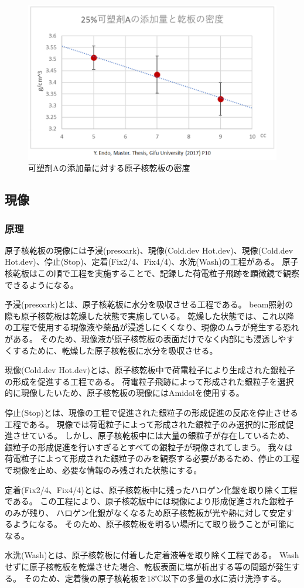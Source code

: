 \documentclass[12pt,a4paper]{jarticle}
\begin{document}
\begin{figure}[htbp]
  \centering
     \includegraphics[width=140mm]{kasozai.png}
  \caption{可塑剤Aの添加量に対する原子核乾板の密度\label{fig:kasozai}}
\end{figure}
\newpage
\subsection{現像}
\subsubsection{原理}
原子核乾板の現像には予浸(presoark)、現像(Cold.dev Hot.dev)、現像(Cold.dev Hot.dev)、停止(Stop)、定着(Fix2/4、Fix4/4)、水洗(Wash)の工程がある。
原子核乾板はこの順で工程を実施することで、記録した荷電粒子飛跡を顕微鏡で観察できるようになる。
\par
予浸(presoark)とは、原子核乾板に水分を吸収させる工程である。
beam照射の際も原子核乾板は乾燥した状態で実施している。
乾燥した状態では、これ以降の工程で使用する現像液や薬品が浸透しにくくなり、現像のムラが発生する恐れがある。
そのため、現像液が原子核乾板の表面だけでなく内部にも浸透しやすくするために、乾燥した原子核乾板に水分を吸収させる。
\par
現像(Cold.dev Hot.dev)とは、原子核乾板中で荷電粒子により生成された銀粒子の形成を促進する工程である。
荷電粒子飛跡によって形成された銀粒子を選択的に現像したいため、原子核乾板の現像にはAmidolを使用する。
\par
停止(Stop)とは、現像の工程で促進された銀粒子の形成促進の反応を停止させる工程である。
現像では荷電粒子によって形成された銀粒子のみ選択的に形成促進させている。
しかし、原子核乾板中には大量の銀粒子が存在しているため、銀粒子の形成促進を行いすぎるとすべての銀粒子が現像されてしまう。
我々は荷電粒子によって形成された銀粒子のみを観察する必要があるため、停止の工程で現像を止め、必要な情報のみ残された状態にする。
\par
定着(Fix2/4、Fix4/4)とは、原子核乾板中に残ったハロゲン化銀を取り除く工程である。
この工程により、原子核乾板中には現像により形成促進された銀粒子のみが残り、
ハロゲン化銀がなくなるため原子核乾板が光や熱に対して安定するようになる。
そのため、原子核乾板を明るい場所にて取り扱うことが可能になる。
\par
水洗(Wash)とは、原子核乾板に付着した定着液等を取り除く工程である。
Washせずに原子核乾板を乾燥させた場合、乾板表面に塩が析出する等の問題が発生する。
そのため、定着後の原子核乾板を18℃以下の多量の水に漬け洗浄する。
\end{document}
